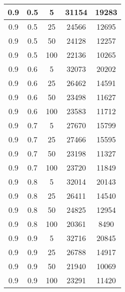 \begin{appendices}
\begin{longtable}[c]{|c|c|c|c|c|}
	0.9& 0.5& 5& 31154&  19283\\
	\hline
	0.9& 0.5& 25& 24566&  12695\\
	\hline
	0.9& 0.5& 50& 24128&  12257\\
	\hline
	0.9& 0.5& 100& 22136&  10265\\
	\hline
	0.9& 0.6& 5& 32073&  20202\\
	\hline
	0.9& 0.6& 25& 26462&  14591\\
	\hline
	0.9& 0.6& 50& 23498&  11627\\
	\hline
	0.9& 0.6& 100& 23583&  11712\\
	\hline
	0.9& 0.7& 5& 27670&  15799\\
	\hline
	0.9& 0.7& 25& 27466&  15595\\
	\hline
	0.9& 0.7& 50& 23198&  11327\\
	\hline
	0.9& 0.7& 100& 23720&  11849\\
	\hline
	0.9& 0.8& 5& 32014&  20143\\
	\hline
	0.9& 0.8& 25& 26411&  14540\\
	\hline
	0.9& 0.8& 50& 24825&  12954\\
	\hline
	0.9& 0.8& 100& 20361&  8490\\
	\hline
	0.9& 0.9& 5& 32716&  20845\\
	\hline
	0.9& 0.9& 25& 26788&  14917\\
	\hline
	0.9& 0.9& 50& 21940&  10069\\
	\hline
	0.9& 0.9& 100& 23291&  11420\\
	\hline
	
	\end{longtable}

	
\end{appendices}